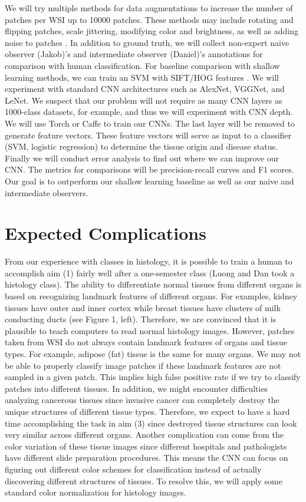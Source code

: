 \documentclass[10pt,twocolumn,letterpaper]{article}
\begin{document}
We will try multiple methods for data augmentations to increase the number of
patches per WSI up to 10000 patches. These methods may include rotating and
flipping patches, scale jittering, modifying color and brightness, as well as
adding noise to patches
\cite{eigen2015predicting}.
In addition to ground truth, we will collect
non-expert naive observer (Jakob)’s and intermediate observer (Daniel)’s
annotations for comparison with human classification. For baseline comparison
with shallow learning methods, we can train an SVM with SIFT/HOG features
\cite{chang2013classification}.
We will experiment with standard CNN architectures such as AlexNet, VGGNet,
and LeNet. We suspect that our problem will not require as many CNN layers
as 1000-class datasets, for example, and thus we will experiment with CNN
depth. We will use Torch or Caffe to train our CNNs. The last layer will be
removed to generate feature vectors. These feature vectors will serve as
input to a classifier (SVM, logistic regression) to determine the tissue
origin and disease status. Finally we will conduct error analysis to find
out where we can improve our CNN. The metrics for comparisons will be
precision-recall curves and F1 scores. Our goal is to outperform our shallow
learning baseline as well as our naive and intermediate observers.

\section{Expected Complications}
\label{sec:Expected Complications}

From our experience with classes in histology, it is possible to train a human
to accomplish aim (1) fairly well after a one-semester class (Luong and Dan
took a histology class). The ability to differentiate normal tissues from
different organs is based on recognizing landmark features of different
organs. For examples, kidney tissues have outer and inner cortex while breast
tissues have clusters of milk conducting ducts (see
Figure 1, left).
Therefore, we are convinced that it is plausible to teach computers to read
normal histology images. However, patches taken from WSI do not always
contain landmark features of organs and tissue types. For example, adipose
(fat) tissue is the same for many organs. We may not be able to properly
classify image patches if these landmark features are not sampled in a given
patch. This implies high false positive rate if we try to classify patches
into different tissues. In addition, we might encounter difficulties analyzing
cancerous tissues since invasive cancer can completely destroy the unique
structures of different tissue types. Therefore, we expect to have a hard
time accomplishing the task in aim (3) since destroyed tissue structures can
look very similar across different organs. Another complication can come from
the color variation of these tissue images since different hospitals and
pathologists have different slide preparation procedures. This means the
CNN can focus on figuring out different color schemes for classification
instead of actually discovering different structures of tissues. To resolve
this, we will apply some standard color normalization for histology images.
\end{document}
